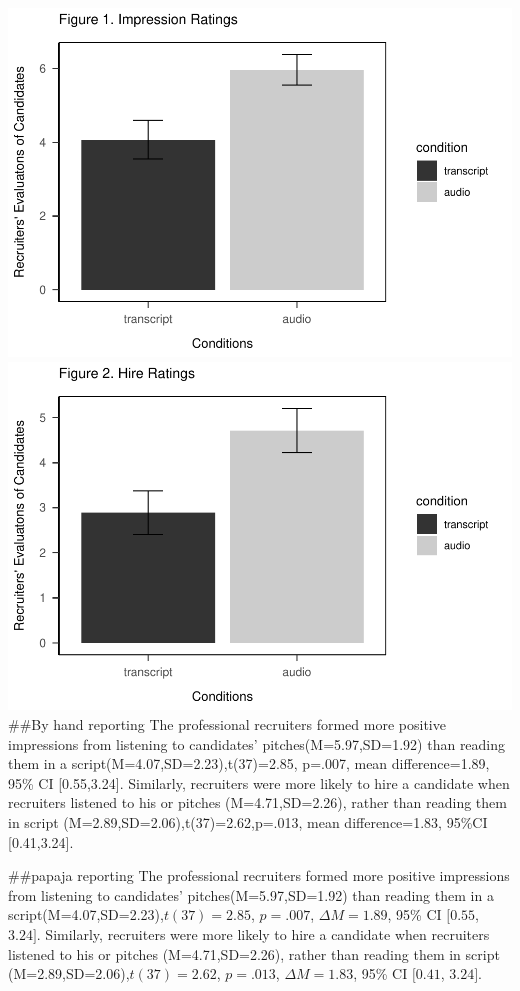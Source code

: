 \documentclass[
  english,
  man]{apa6}
\begin{document}
\includegraphics{APAreport_files/figure-latex/unnamed-chunk-3-1.pdf} \includegraphics{APAreport_files/figure-latex/unnamed-chunk-3-2.pdf}
\#\#By hand reporting
The professional recruiters formed more positive impressions from listening to candidates' pitches(M=5.97,SD=1.92) than reading them in a script(M=4.07,SD=2.23),t(37)=2.85, p=.007, mean difference=1.89, 95\% CI {[}0.55,3.24{]}. Similarly, recruiters were more likely to hire a candidate when recruiters listened to his or pitches (M=4.71,SD=2.26), rather than reading them in script (M=2.89,SD=2.06),t(37)=2.62,p=.013, mean difference=1.83, 95\%CI {[}0.41,3.24{]}.

\#\#papaja reporting
The professional recruiters formed more positive impressions from listening to candidates' pitches(M=5.97,SD=1.92) than reading them in a script(M=4.07,SD=2.23),\(t(37) = 2.85\), \(p = .007\), \(\Delta M = 1.89\), 95\% CI \([0.55\), \(3.24]\). Similarly, recruiters were more likely to hire a candidate when recruiters listened to his or pitches (M=4.71,SD=2.26), rather than reading them in script (M=2.89,SD=2.06),\(t(37) = 2.62\), \(p = .013\), \(\Delta M = 1.83\), 95\% CI \([0.41\), \(3.24]\).
\end{document}
